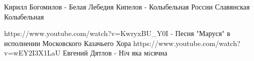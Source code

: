  
 

Кирилл Богомилов - Белая Лебедия
Кипелов - Колыбельная России
Славянская Колыбельная

https://www.youtube.com/watch?v=KwryxBU_Y0I - Песня "Маруся" в исполнении Московского Казачьего Хора
https://www.youtube.com/watch?v=wEY2I3X1LaU Евгений Дятлов - Нiч яка мiсячна
